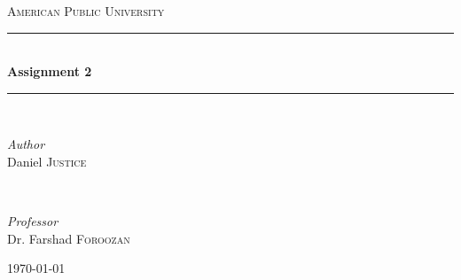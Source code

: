 \documentclass[11pt]{article}
\begin{document}

\begin{titlepage} %
	\newcommand{\HRule}{\rule{\linewidth}{0.5mm}} %

	\center %


	\textsc{\LARGE American Public University}\\[1.5cm] %


	\HRule\\[0.4cm]

	{\huge\bfseries Assignment 2}\\[0.4cm] %

	\HRule\\[1.5cm]


	\begin{minipage}{0.4\textwidth}
		\begin{flushleft}
			\large
			\textit{Author}\\
			Daniel \textsc{Justice} %
		\end{flushleft}
	\end{minipage}
	~
	\begin{minipage}{0.4\textwidth}
		\begin{flushright}
			\large
			\textit{Professor}\\
			Dr. Farshad \textsc{Foroozan} %
		\end{flushright}
	\end{minipage}


	\vfill\vfill\vfill
	{\large\today} %
	\vfill

\end{titlepage}
\end{document}
